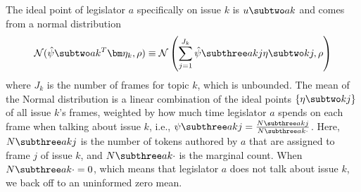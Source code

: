 The ideal point of legislator $a$ specifically on issue $k$ is $u \subtwo ak$
and comes from a normal distribution
\begin{equation}
 \mathcal{N}(\hat{\psi} \subtwo ak^T \bm \eta_k, \rho) \equiv \mathcal{N}\left(\sum_{j=1}^{J_k} \hat{\psi} \subthree akj \eta \subtwo kj, \rho\right)
  \label{eqn:c6_idealpoint}
\end{equation}
where $J_k$ is the number of frames for topic $k$, which is unbounded. The mean
of the Normal distribution is a linear combination of the ideal points $\{\eta
\subtwo kj\}$ of all issue $k$'s frames, weighted by how much time legislator
$a$ spends on each frame when talking about issue $k$, i.e., $\psi \subthree akj
= \frac{N \subthree akj}{N \subthree ak{\cdot}}$. Here, $N \subthree akj$ is the
number of tokens authored by $a$ that are assigned to frame $j$ of issue $k$,
and $N \subthree ak{\cdot}$ is the marginal count. When $N \subthree ak{\cdot} =
0$, which means that legislator $a$ does not talk about issue $k$, we back off
to an uninformed zero mean.



